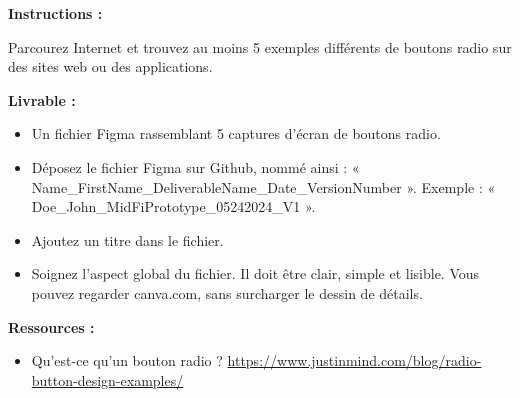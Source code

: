 \makeheaderfiles

\textbf{Instructions :}

Parcourez Internet et trouvez au moins 5 exemples différents de boutons radio sur des sites web ou des applications.

\textbf{Livrable :}

\begin{itemize}
\item Un fichier Figma rassemblant 5 captures d'écran de boutons radio.
\item Déposez le fichier Figma sur Github, nommé ainsi : « Name\_FirstName\_DeliverableName\_Date\_VersionNumber ». Exemple : « Doe\_John\_MidFiPrototype\_05242024\_V1 ».
\item Ajoutez un titre dans le fichier.
\item Soignez l'aspect global du fichier. Il doit être clair, simple et lisible. Vous pouvez regarder canva.com, sans surcharger le dessin de détails.
\end{itemize}

\textbf{Ressources :}

\begin{itemize}
\item Qu'est-ce qu'un bouton radio ? \url{https://www.justinmind.com/blog/radio-button-design-examples/}
\end{itemize}

